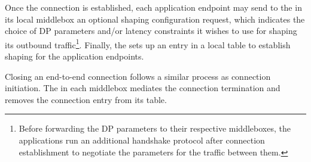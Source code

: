 %

Once the connection is established, each application endpoint may send to the
{\ushaper} in its local middlebox an optional shaping configuration
request, which indicates the choice of DP parameters and/or latency constraints
it wishes to use for shaping its outbound
traffic\footnote{Before forwarding the DP parameters to their respective
middleboxes, the applications run an additional handshake protocol after
connection establishment to negotiate the parameters for the traffic between
them.}.
%
Finally, the {\ushaper} sets up an entry in a local {\flowmap} table to establish
shaping for the application endpoints.

Closing an end-to-end connection follows a similar process as connection
initiation. The {\ushaper} in each middlebox mediates the connection termination
and removes the connection entry from its {\flowmap} table.
\fi

